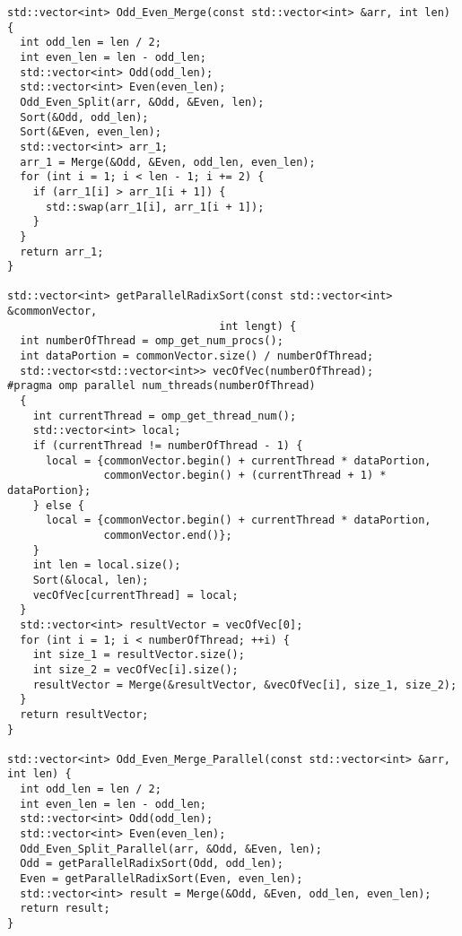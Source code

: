 \documentclass{report}
\begin{document}
\begin{lstlisting}
std::vector<int> Odd_Even_Merge(const std::vector<int> &arr, int len) {
  int odd_len = len / 2;
  int even_len = len - odd_len;
  std::vector<int> Odd(odd_len);
  std::vector<int> Even(even_len);
  Odd_Even_Split(arr, &Odd, &Even, len);
  Sort(&Odd, odd_len);
  Sort(&Even, even_len);
  std::vector<int> arr_1;
  arr_1 = Merge(&Odd, &Even, odd_len, even_len);
  for (int i = 1; i < len - 1; i += 2) {
    if (arr_1[i] > arr_1[i + 1]) {
      std::swap(arr_1[i], arr_1[i + 1]);
    }
  }
  return arr_1;
}

std::vector<int> getParallelRadixSort(const std::vector<int> &commonVector,
                                 int lengt) {
  int numberOfThread = omp_get_num_procs();
  int dataPortion = commonVector.size() / numberOfThread;
  std::vector<std::vector<int>> vecOfVec(numberOfThread);
#pragma omp parallel num_threads(numberOfThread)
  {
    int currentThread = omp_get_thread_num();
    std::vector<int> local;
    if (currentThread != numberOfThread - 1) {
      local = {commonVector.begin() + currentThread * dataPortion,
               commonVector.begin() + (currentThread + 1) * dataPortion};
    } else {
      local = {commonVector.begin() + currentThread * dataPortion,
               commonVector.end()};
    }
    int len = local.size();
    Sort(&local, len);
    vecOfVec[currentThread] = local;
  }
  std::vector<int> resultVector = vecOfVec[0];
  for (int i = 1; i < numberOfThread; ++i) {
    int size_1 = resultVector.size();
    int size_2 = vecOfVec[i].size();
    resultVector = Merge(&resultVector, &vecOfVec[i], size_1, size_2);
  }
  return resultVector;
}

std::vector<int> Odd_Even_Merge_Parallel(const std::vector<int> &arr, int len) {
  int odd_len = len / 2;
  int even_len = len - odd_len;
  std::vector<int> Odd(odd_len);
  std::vector<int> Even(even_len);
  Odd_Even_Split_Parallel(arr, &Odd, &Even, len);
  Odd = getParallelRadixSort(Odd, odd_len);
  Even = getParallelRadixSort(Even, even_len);
  std::vector<int> result = Merge(&Odd, &Even, odd_len, even_len);
  return result;
}

\end{lstlisting}
\end{document}
